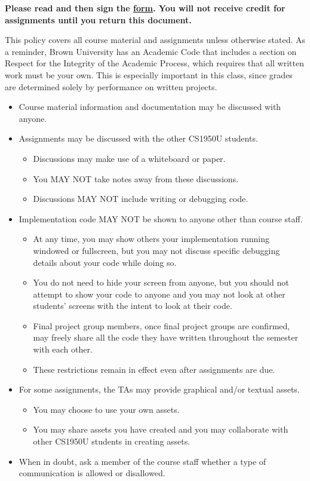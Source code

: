 \documentclass{cs195u}
\begin{document}
 \textbf{Please read and then sign the \href{https://forms.gle/xv71JEBsCUViSGiB6}{form}. You will not receive credit for assignments until you return this document.}
 
 This policy covers all course material and assignments unless otherwise stated. As a reminder, Brown University has an Academic Code that includes a section on Respect for the Integrity of the Academic Process, which requires that all written work must be your own. This is especially important in this class, since grades are determined solely by performance on written projects.
 
 \begin{itemize}
  \item Course material information and documentation may be discussed with anyone.
  \item Assignments may be discussed with the other CS1950U students.
  \begin{itemize}
   \item Discussions may make use of a whiteboard or paper.
   \item You MAY NOT take notes away from these discussions.
   \item Discussions MAY NOT include writing or debugging code.
  \end{itemize}
  \item Implementation code MAY NOT be shown to anyone other than course staff.
  \begin{itemize}
   \item At any time, you may show others your implementation running windowed or fullscreen, but you may not discuss specific debugging details about your code while doing so.
   \item You do not need to hide your screen from anyone, but you should not attempt to show your code to anyone and you may not look at other students' screens with the intent to look at their code.
   \item Final project group members, once final project groups are confirmed, may freely share all the code they have written throughout the semester with each other.
   \item These restrictions remain in effect even after assignments are due.
  \end{itemize}
  \item For some assignments, the TAs may provide graphical and/or textual assets.
  \begin{itemize}
   \item You may choose to use your own assets.
   \item You may share assets you have created and you may collaborate with other CS1950U students in creating assets.
  \end{itemize}
  \item When in doubt, ask a member of the course staff whether a type of communication is allowed or disallowed.
 \end{itemize}
 
\end{document}
